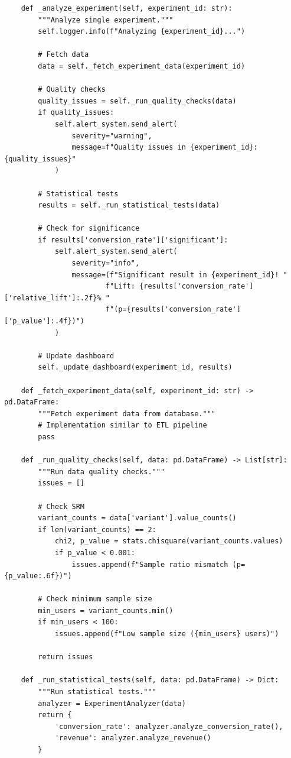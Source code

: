 \begin{lstlisting}
    def _analyze_experiment(self, experiment_id: str):
        """Analyze single experiment."""
        self.logger.info(f"Analyzing {experiment_id}...")

        # Fetch data
        data = self._fetch_experiment_data(experiment_id)

        # Quality checks
        quality_issues = self._run_quality_checks(data)
        if quality_issues:
            self.alert_system.send_alert(
                severity="warning",
                message=f"Quality issues in {experiment_id}: {quality_issues}"
            )

        # Statistical tests
        results = self._run_statistical_tests(data)

        # Check for significance
        if results['conversion_rate']['significant']:
            self.alert_system.send_alert(
                severity="info",
                message=(f"Significant result in {experiment_id}! "
                        f"Lift: {results['conversion_rate']['relative_lift']:.2f}% "
                        f"(p={results['conversion_rate']['p_value']:.4f})")
            )

        # Update dashboard
        self._update_dashboard(experiment_id, results)

    def _fetch_experiment_data(self, experiment_id: str) -> pd.DataFrame:
        """Fetch experiment data from database."""
        # Implementation similar to ETL pipeline
        pass

    def _run_quality_checks(self, data: pd.DataFrame) -> List[str]:
        """Run data quality checks."""
        issues = []

        # Check SRM
        variant_counts = data['variant'].value_counts()
        if len(variant_counts) == 2:
            chi2, p_value = stats.chisquare(variant_counts.values)
            if p_value < 0.001:
                issues.append(f"Sample ratio mismatch (p={p_value:.6f})")

        # Check minimum sample size
        min_users = variant_counts.min()
        if min_users < 100:
            issues.append(f"Low sample size ({min_users} users)")

        return issues

    def _run_statistical_tests(self, data: pd.DataFrame) -> Dict:
        """Run statistical tests."""
        analyzer = ExperimentAnalyzer(data)
        return {
            'conversion_rate': analyzer.analyze_conversion_rate(),
            'revenue': analyzer.analyze_revenue()
        }


\end{lstlisting}
